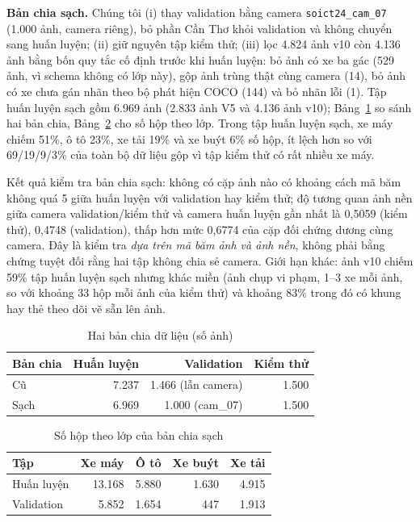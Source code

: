 \documentclass[10pt,journal,letterpaper]{IEEEtran}
\begin{document}
\textbf{Bản chia sạch.} Chúng tôi (i) thay validation bằng camera \texttt{soict24\_cam\_07} (1.000 ảnh, camera riêng), bỏ phần Cần Thơ khỏi validation và không chuyển sang huấn luyện; (ii) giữ nguyên tập kiểm thử; (iii) lọc 4.824 ảnh v10 còn 4.136 ảnh bằng bốn quy tắc cố định trước khi huấn luyện: bỏ ảnh có xe ba gác (529 ảnh, vì schema không có lớp này), gộp ảnh trùng thật cùng camera (14), bỏ ảnh có xe chưa gán nhãn theo bộ phát hiện COCO (144) và bỏ nhãn lỗi (1). Tập huấn luyện sạch gồm 6.969 ảnh (2.833 ảnh V5 và 4.136 ảnh v10); Bảng~\ref{tab:split} so sánh hai bản chia, Bảng~\ref{tab:cleanbox} cho số hộp theo lớp. Trong tập huấn luyện sạch, xe máy chiếm 51\%, ô tô 23\%, xe tải 19\% và xe buýt 6\% số hộp, ít lệch hơn so với 69/19/9/3\% của toàn bộ dữ liệu gộp vì tập kiểm thử có rất nhiều xe máy.

Kết quả kiểm tra bản chia sạch: không có cặp ảnh nào có khoảng cách mã băm không quá 5 giữa huấn luyện với validation hay kiểm thử; độ tương quan ảnh nền giữa camera validation/kiểm thử và camera huấn luyện gần nhất là 0,5059 (kiểm thử), 0,4748 (validation), thấp hơn mức 0,6774 của cặp đối chứng dương cùng camera. Đây là kiểm tra \emph{dựa trên mã băm ảnh và ảnh nền}, không phải bằng chứng tuyệt đối rằng hai tập không chia sẻ camera. Giới hạn khác: ảnh v10 chiếm 59\% tập huấn luyện sạch nhưng khác miền (ảnh chụp vi phạm, 1--3 xe mỗi ảnh, so với khoảng 33 hộp mỗi ảnh của kiểm thử) và khoảng 83\% trong đó có khung hay thẻ theo dõi vẽ sẵn lên ảnh.

\begin{table}[!t]
\caption{Hai bản chia dữ liệu (số ảnh)}
\label{tab:split}
\centering
\footnotesize
\begin{tabular}{lrrr}
\toprule
Bản chia & Huấn luyện & Validation & Kiểm thử \\
\midrule
Cũ & 7.237 & 1.466 (lẫn camera) & 1.500 \\
Sạch & 6.969 & 1.000 (cam\_07) & 1.500 \\
\bottomrule
\end{tabular}
\end{table}

\begin{table}[!t]
\caption{Số hộp theo lớp của bản chia sạch}
\label{tab:cleanbox}
\centering
\footnotesize
\begin{tabular}{lrrrr}
\toprule
Tập & Xe máy & Ô tô & Xe buýt & Xe tải \\
\midrule
Huấn luyện & 13.168 & 5.880 & 1.630 & 4.915 \\
Validation & 5.852 & 1.654 & 447 & 1.913 \\
\bottomrule
\end{tabular}
\end{table}
\end{document}

